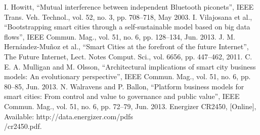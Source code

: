\documentclass[conference]{IEEEtran}
\begin{document}
\begin{thebibliography}{00}
 I. Howitt, “Mutual interference between independent Bluetooth piconets”, IEEE Trans. Veh. Technol., vol. 52, no. 3, pp. 708–718, May 2003.
 I. Vilajosana et al., “Bootstrapping smart cities through a self-sustainable model based on big data flows”, IEEE Commun. Mag., vol. 51, no. 6, pp. 128–134, Jun. 2013.
J. M. Hernández-Muñoz et al., “Smart Cities at the forefront of the future Internet”, The Future Internet, Lect. Notes Comput. Sci., vol. 6656, pp. 447–462, 2011.
 C. E. A. Mulligan and M. Olsson, “Architectural implications of smart city
business models: An evolutionary perspective”, IEEE Commun. Mag.,
vol. 51, no. 6, pp. 80–85, Jun. 2013.
 N. Walravens and P. Ballon, “Platform business models for smart cities: From control and value to governance and public value”, IEEE Commun. Mag., vol. 51, no. 6, pp. 72–79, Jun. 2013.
 Energizer CR2450, [Online], Available: http://data.energizer.com/pdfs\\/cr2450.pdf.

\end{thebibliography}
\end{document}
